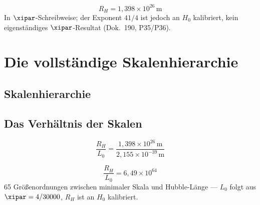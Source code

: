 \begin{keyresult}
\begin{equation}
	\boxed{R_H = 1{,}398 \times 10^{26}\,\text{m}}
\end{equation}
In $\xipar$-Schreibweise; der Exponent $41/4$ ist jedoch an $H_0$ kalibriert, kein eigenständiges $\xipar$-Resultat (Dok.~190, P35/P36).
\end{keyresult}

\section{Die vollständige Skalenhierarchie}

\subsection{Skalenhierarchie}

\begin{table}[h]
\centering
{}
\caption{Skalenhierarchie in $\xipar$-Schreibweise (kosmologische Skala $R_H$ an $H_0$ kalibriert)}
\end{table}

\subsection{Das Verhältnis der Skalen}

\begin{equation}
	\frac{R_H}{L_0} = \frac{1{,}398 \times 10^{26}\,\text{m}}{2{,}155 \times 10^{-39}\,\text{m}}
\end{equation}

\begin{keyresult}
\begin{equation}
	\boxed{\frac{R_H}{L_0} = 6{,}49 \times 10^{64}}
\end{equation}
65 Größenordnungen zwischen minimaler Skala und Hubble-Länge — $L_0$ folgt aus $\xipar = 4/30000$, $R_H$ ist an $H_0$ kalibriert.
\end{keyresult}

